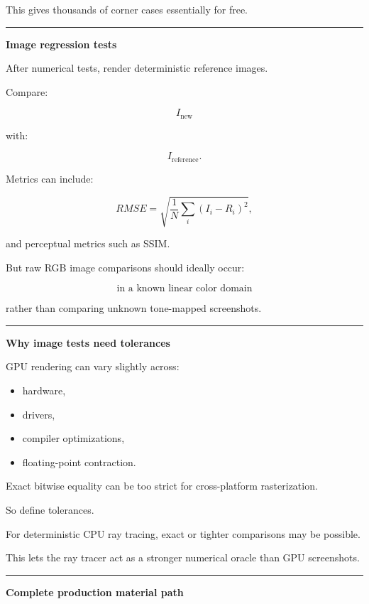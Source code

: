 This gives thousands of corner cases essentially for free.

\begin{center}\rule{0.5\linewidth}{0.5pt}\end{center}

\textbf{Image regression tests}

After numerical tests, render deterministic reference images.

Compare:

\[
I_{\text{new}}
\]

with:

\[
I_{\text{reference}}.
\]

Metrics can include:

\[
RMSE
=
\sqrt{
\frac1N
\sum_i
(I_i-R_i)^2
},
\]

and perceptual metrics such as SSIM.

But raw RGB image comparisons should ideally occur:

\[
\boxed{
\text{in a known linear color domain}
}
\]

rather than comparing unknown tone-mapped screenshots.

\begin{center}\rule{0.5\linewidth}{0.5pt}\end{center}

\textbf{Why image tests need tolerances}

GPU rendering can vary slightly across:

\begin{itemize}
\tightlist
\item
  hardware,
\item
  drivers,
\item
  compiler optimizations,
\item
  floating-point contraction.
\end{itemize}

Exact bitwise equality can be too strict for cross-platform rasterization.

So define tolerances.

For deterministic CPU ray tracing, exact or tighter comparisons may be possible.

This lets the ray tracer act as a stronger numerical oracle than GPU screenshots.

\begin{center}\rule{0.5\linewidth}{0.5pt}\end{center}

\textbf{Complete production material path}

